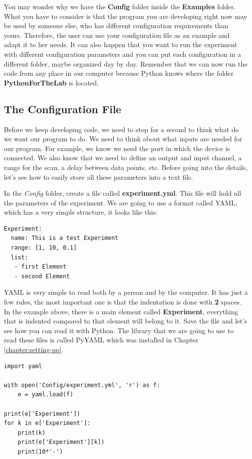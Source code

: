 You may wonder why we have the \textbf{Config} folder inside the \textbf{Examples} folder. What you have to consider is that the program you are developing right now may be used by someone else, who has different configuration requirements than yours. Therefore, the user can use your configuration file as an example and adapt it to her needs. It can also happen that you want to run the experiment with different configuration parameters and you can put each configuration in a different folder, maybe organized day by day. Remember that we can now run the code from any place in our computer because Python knows where the folder \textbf{PythonForTheLab} is located. 

\subsection{The Configuration File}\label{subsection:configuration-file}
Before we keep developing code, we need to stop for a second to think what do we want our program to do. We need to think about what inputs are needed for our program. For example, we know we need the port in which the device is connected. We also know that we need to define an output and input channel, a range for the scan, a delay between data points, etc. Before going into the details, let's see how to easily store all these parameters into a text file. 

In the \emph{Config} folder, create a file called \textbf{experiment.yml}. This file will hold all the parameters of the experiment. We are going to use a format called {YAML}, which has a very simple structure, it looks like this:

\begin{verbatim}
Experiment:
  name: This is a test Experiment
  range: [1, 10, 0.1]
  list:
   - first Element
   - second Element
\end{verbatim}

{YAML} is very simple to read both by a person and by the computer. It has just a few rules, the most important one is that the indentation is done with \textbf{2} spaces. In the example above, there is a main element called \textbf{Experiment}, everything that is indented compared to that element will belong to it. Save the file and let's see how you can read it with Python. The library that we are going to use to read these files is called PyYAML which was installed in Chapter \ref{chapter:setting-up}. 

\begin{verbatim}
import yaml

with open('Config/experiment.yml', 'r') as f:
    e = yaml.load(f)

print(e['Experiment'])
for k in e['Experiment']:
    print(k)
    print(e['Experiment'][k])
    print(10*'-')
\end{verbatim}

